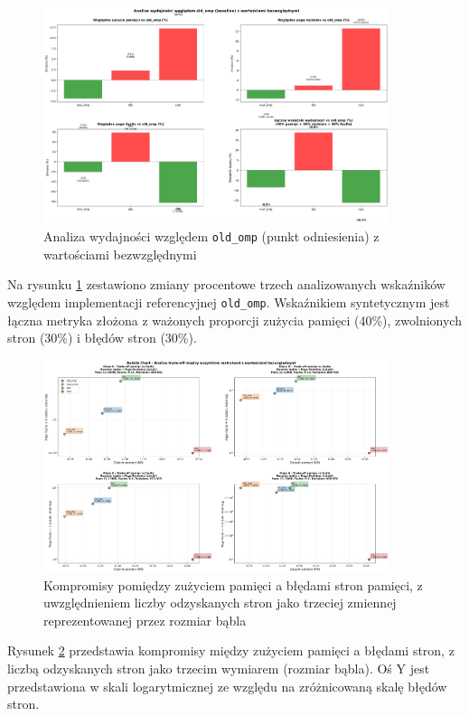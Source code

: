 \begin{figure}[H]
    \centering
    \includegraphics[width=0.9\textwidth]{analiza/images/parallel/ep/arm/chart_05_performance_ratios.png}
    \caption{Analiza wydajności względem \texttt{old\_omp} (punkt odniesienia) z wartościami bezwzględnymi}
    \label{ep_analiza_wzgledem_old_omp}
\end{figure}
Na rysunku \ref{ep_analiza_wzgledem_old_omp} zestawiono zmiany procentowe trzech analizowanych wskaźników względem implementacji referencyjnej \texttt{old\_omp}. Wskaźnikiem syntetycznym jest łączna metryka złożona z ważonych proporcji zużycia pamięci (40\%), zwolnionych stron (30\%) i błędów stron (30\%).



\begin{figure}[H]
    \centering
    \includegraphics[width=0.9\textwidth]{analiza/images/parallel/ep/arm/chart_06_bubble_chart.png}
    \caption{Kompromisy  pomiędzy zużyciem pamięci a błędami stron pamięci, z uwzględnieniem liczby odzyskanych stron jako trzeciej zmiennej reprezentowanej przez rozmiar bąbla}
    \label{ep_kompromisy_pamiec_bledy}
\end{figure}
Rysunek \ref{ep_kompromisy_pamiec_bledy} przedstawia kompromisy między zużyciem pamięci a błędami stron, z liczbą odzyskanych stron jako trzecim wymiarem (rozmiar bąbla). Oś Y jest przedstawiona w skali logarytmicznej ze względu na zróżnicowaną skalę błędów stron.


